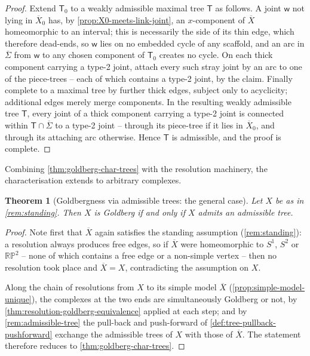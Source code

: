 \documentclass[reqno]{amsart}
\newtheorem{theorem}{Theorem}[section]
\theoremstyle{definition}
\newcommand\sfT{\mathsf{T}}
\newcommand\sfw{\mathsf{w}}
\newcommand{\RP}{\mathbb{RP}}
\renewcommand{\bar}{\overline}
\numberwithin{equation}{section}
\begin{document}
\begin{proof}
Extend \(\sfT_0\) to a weakly admissible maximal tree \(\sfT\) as follows.
A joint \(\sfw\) not lying in \(\bar X_0\) has, by
\cref{prop:X0-meets-link-joint}, an \(x\)-component of
\(\bar X\) homeomorphic to an interval; this is necessarily the
side of its thin edge, which therefore dead-ends, so \(\sfw\) lies
on no embedded cycle of any scaffold, and an arc in
\(\bar\Sigma\) from \(\sfw\) to any chosen component of \(\sfT_0\)
creates no cycle. On each thick component carrying a type-2
joint, attach every such stray joint by an arc to one of the
piece-trees -- each of which contains a type-2 joint, by the
claim. Finally complete to a maximal tree by further thick
edges, subject only to acyclicity; additional edges merely
merge components. In the resulting weakly admissible tree \(\sfT\), every
joint of a thick component carrying a type-2 joint is connected
within \(\sfT\cap\bar\Sigma\) to a type-2 joint -- through its
piece-tree if it lies in \(\bar X_0\), and through its
attaching arc otherwise. Hence \(\sfT\) is admissible,
and the proof is complete.
\end{proof}

Combining \cref{thm:goldberg-char-trees} with the resolution
machinery, the characterisation extends to arbitrary complexes.

\begin{theorem}[Goldbergness via admissible trees: the
general case]\label{thm:goldberg-char-trees-general}
Let \(X\) be as in \cref{rem:standing}. Then \(X\) is
Goldberg if and only if \(X\) admits an
admissible tree.
\end{theorem}

\begin{proof}
Note first that \(\bar X\) again satisfies the standing
assumption (\cref{rem:standing}): a resolution always produces
free edges, so if \(\bar X\) were homeomorphic to \(S^1\),
\(S^2\) or \(\RP^2\) -- none of which contains a free edge or a
non-simple vertex -- then no resolution took place and
\(\bar X=X\), contradicting the assumption on \(X\).

Along the chain of resolutions from \(X\) to its simple model
\(\bar X\) (\cref{prop:simple-model-unique}), the complexes at
the two ends are simultaneously Goldberg or not, by
\cref{thm:resolution-goldberg-equivalence} applied at each
step; and by \cref{rem:admissible-tree} the pull-back and
push-forward of \cref{def:tree-pullback-pushforward} exchange
the admissible trees of \(X\) with those of
\(\bar X\). The statement therefore reduces to
\cref{thm:goldberg-char-trees}.
\end{proof}
\end{document}
